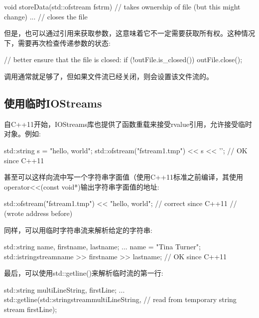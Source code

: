 \begin{cppcode}
void storeData(std::ofstream fstrm) // takes ownership of file (but this might change)
{
	...
} // closes the file
\end{cppcode}

但是，也可以通过引用来获取参数，这意味着它不一定需要获取所有权。这种情况下，需要再次检查传递参数的状态:

\begin{cppcode}
// better ensure that the file is closed:
if (!outFile.is_closed()) {
	outFile.close();
}
\end{cppcode}

调用通常就足够了，但如果文件流已经关闭，则会设置该文件流的。

\subsection{使用临时IOStreams}

自C++11开始，IOStreams库也提供了函数重载来接受rvalue引用，允许接受临时对象。例如:

\begin{cppcode}
std::string s = "hello, world";
std::ofstream("fstream1.tmp") << s << '\n'; // OK since C++11
\end{cppcode}

甚至可以这样向流中写一个字符串字面值（使用C++11标准之前编译，其使用operator<<(const void*)输出字符串字面值的地址:

\begin{cppcode}
std::ofstream("fstream1.tmp") << "hello, world\n"; // correct since C++11
// (wrote address before)
\end{cppcode}

同样，可以用临时字符串流来解析给定的字符串:

\begin{cppcode}
std::string name, firstname, lastname;
...
name = "Tina Turner";
std::istringstream{name} >> firstname >> lastname; // OK since C++11
\end{cppcode}

最后，可以使用std::getline()来解析临时流的第一行:

\begin{cppcode}
std::string multiLineString, firstLine;
...
std::getline(std::stringstream{multiLineString}, // read from temporary string stream
firstLine);
\end{cppcode}



























